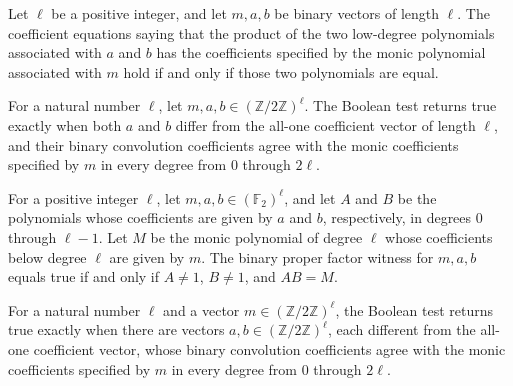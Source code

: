 \begin{theorem}
\label{FABL.binaryProductEqMonic_eq_true_iff}
\leanok
{}
Let $\ell$ be a positive integer, and let $m,a,b$ be binary vectors of length $\ell$.
The coefficient equations saying that the product of the two low-degree polynomials
associated with $a$ and $b$ has the coefficients specified by the monic polynomial
associated with $m$ hold if and only if those two polynomials are equal.
\end{theorem}

\begin{definition}
\label{FABL.binaryProperFactorWitness}
\leanok
{}
For a natural number $\ell$, let $m,a,b\in(\mathbb{Z}/2\mathbb{Z})^\ell$. The Boolean
test returns true exactly when both $a$ and $b$ differ from the all-one coefficient
vector of length $\ell$, and their binary convolution coefficients agree with the monic
coefficients specified by $m$ in every degree from $0$ through $2\ell$.
\end{definition}

\begin{theorem}
\label{FABL.binaryProperFactorWitness_eq_true_iff}
\leanok
{}
For a positive integer $\ell$, let $m,a,b\in(\mathbb{F}_2)^\ell$, and let $A$ and $B$ be
the polynomials whose coefficients are given by $a$ and $b$, respectively, in degrees
$0$ through $\ell-1$. Let $M$ be the monic polynomial of degree $\ell$ whose
coefficients below degree $\ell$ are given by $m$. The binary proper factor witness for
$m,a,b$ equals true if and only if $A\ne 1$, $B\ne 1$, and $AB=M$.
\end{theorem}

\begin{definition}
\label{FABL.binaryHasProperFactor}
\leanok
{}
For a natural number $\ell$ and a vector $m\in(\mathbb{Z}/2\mathbb{Z})^\ell$, the
Boolean test returns true exactly when there are vectors
$a,b\in(\mathbb{Z}/2\mathbb{Z})^\ell$, each different from the all-one coefficient
vector, whose binary convolution coefficients agree with the monic coefficients
specified by $m$ in every degree from $0$ through $2\ell$.
\end{definition}

